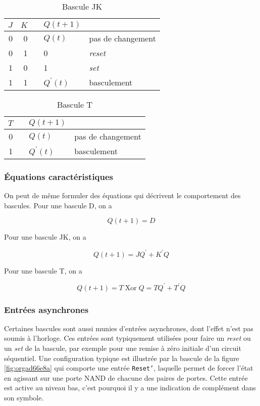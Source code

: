 \documentclass[11pt]{article}
\begin{document}
\begin{table}[htbp]
\caption{\label{tab:orgc70e9d7}Bascule JK}
\centering
\begin{tabular}{rrlll}
\(J\) & \(K\) &  & \(Q(t+1)\) & \\[0pt]
\hline
0 & 0 &  & \(Q(t)\) & pas de changement\\[0pt]
0 & 1 &  & 0 & \emph{reset}\\[0pt]
1 & 0 &  & 1 & \emph{set}\\[0pt]
1 & 1 &  & \(Q^\prime(t)\) & basculement\\[0pt]
\end{tabular}
\end{table}

\begin{table}[htbp]
\caption{\label{tab:org32a0728}Bascule T}
\centering
\begin{tabular}{rlll}
\(T\) &  & \(Q(t+1)\) & \\[0pt]
\hline
0 &  & \(Q(t)\) & pas de changement\\[0pt]
1 &  & \(Q^\prime(t)\) & basculement\\[0pt]
\end{tabular}
\end{table}

\subsubsection{Équations caractéristiques}
\label{sec:org32fa97a}

On peut de même formuler des équations qui décrivent le comportement
des bascules. Pour une bascule D, on a

$$ Q(t+1) = D $$

Pour une bascule JK, on a

$$ Q(t+1) =J Q^\prime + K^\prime Q $$

Pour une bascule T, on a

$$ Q(t+1) = T \operatorname{Xor} Q = T Q^\prime + T^\prime Q $$

\subsubsection{Entrées asynchrones}
\label{sec:org6f7e157}

Certaines bascules sont aussi munies d'entrées asynchrones, dont
l'effet n'est pas soumis à l'horloge. Ces entrées sont typiquement
utilisées pour faire un \emph{reset} ou un \emph{set} de la bascule, par exemple
pour une remise à zéro initiale d'un circuit séquentiel. Une
configuration typique est illustrée par la bascule de la figure
\ref{fig:orgad66e8a} qui comporte une entrée \texttt{Reset'}, laquelle
permet de forcer l'état en agissant sur une porte NAND de chacune des
paires de portes. Cette entrée est active au niveau bas, c'est
pourquoi il y a une indication de complément dans son symbole.
\end{document}
